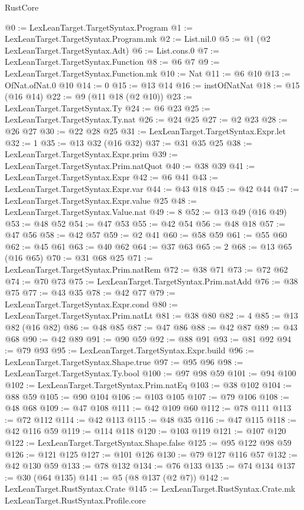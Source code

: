 \begin{lexlean}{RustCore}
\begin{coremodule}
@0 := LexLeanTarget.TargetSyntax.Program
@1 := LexLeanTarget.TargetSyntax.Program.mk
@2 := List.nil.{0}
@5 := @1 (@2 LexLeanTarget.TargetSyntax.Adt)
@6 := List.cons.{0}
@7 := LexLeanTarget.TargetSyntax.Function
@8 := @6 @7
@9 := LexLeanTarget.TargetSyntax.Function.mk
@10 := Nat
@11 := @6 @10
@13 := OfNat.ofNat.{0} @10
@14 := 0
@15 := @13 @14
@16 := instOfNatNat
@18 := @15 (@16 @14)
@22 := @9 (@11 @18 (@2 @10))
@23 := LexLeanTarget.TargetSyntax.Ty
@24 := @6 @23
@25 := LexLeanTarget.TargetSyntax.Ty.nat
@26 := @24 @25
@27 := @2 @23
@28 := @26 @27
@30 := @22 @28 @25
@31 := LexLeanTarget.TargetSyntax.Expr.let
@32 := 1
@35 := @13 @32 (@16 @32)
@37 := @31 @35 @25
@38 := LexLeanTarget.TargetSyntax.Expr.prim
@39 := LexLeanTarget.TargetSyntax.Prim.natQuot
@40 := @38 @39
@41 := LexLeanTarget.TargetSyntax.Expr
@42 := @6 @41
@43 := LexLeanTarget.TargetSyntax.Expr.var
@44 := @43 @18
@45 := @42 @44
@47 := LexLeanTarget.TargetSyntax.Expr.value @25
@48 := LexLeanTarget.TargetSyntax.Value.nat
@49 := 8
@52 := @13 @49 (@16 @49)
@53 := @48 @52
@54 := @47 @53
@55 := @42 @54
@56 := @48 @18
@57 := @47 @56
@58 := @42 @57
@59 := @2 @41
@60 := @58 @59
@61 := @55 @60
@62 := @45 @61
@63 := @40 @62
@64 := @37 @63
@65 := 2
@68 := @13 @65 (@16 @65)
@70 := @31 @68 @25
@71 := LexLeanTarget.TargetSyntax.Prim.natRem
@72 := @38 @71
@73 := @72 @62
@74 := @70 @73
@75 := LexLeanTarget.TargetSyntax.Prim.natAdd
@76 := @38 @75
@77 := @43 @35
@78 := @42 @77
@79 := LexLeanTarget.TargetSyntax.Expr.cond
@80 := LexLeanTarget.TargetSyntax.Prim.natLt
@81 := @38 @80
@82 := 4
@85 := @13 @82 (@16 @82)
@86 := @48 @85
@87 := @47 @86
@88 := @42 @87
@89 := @43 @68
@90 := @42 @89
@91 := @90 @59
@92 := @88 @91
@93 := @81 @92
@94 := @79 @93
@95 := LexLeanTarget.TargetSyntax.Expr.build
@96 := LexLeanTarget.TargetSyntax.Shape.true
@97 := @95 @96
@98 := LexLeanTarget.TargetSyntax.Ty.bool
@100 := @97 @98 @59
@101 := @94 @100
@102 := LexLeanTarget.TargetSyntax.Prim.natEq
@103 := @38 @102
@104 := @88 @59
@105 := @90 @104
@106 := @103 @105
@107 := @79 @106
@108 := @48 @68
@109 := @47 @108
@111 := @42 @109 @60
@112 := @78 @111
@113 := @72 @112
@114 := @42 @113
@115 := @48 @35
@116 := @47 @115
@118 := @42 @116 @59
@119 := @114 @118
@120 := @103 @119
@121 := @107 @120
@122 := LexLeanTarget.TargetSyntax.Shape.false
@125 := @95 @122 @98 @59
@126 := @121 @125
@127 := @101 @126
@130 := @79 @127 @116 @57
@132 := @42 @130 @59
@133 := @78 @132
@134 := @76 @133
@135 := @74 @134
@137 := @30 (@64 @135)
@141 := @5 (@8 @137 (@2 @7))
@142 := LexLeanTarget.RustSyntax.Crate
@145 := LexLeanTarget.RustSyntax.Crate.mk LexLeanTarget.RustSyntax.Profile.core

\end{coremodule}
\end{lexlean}
